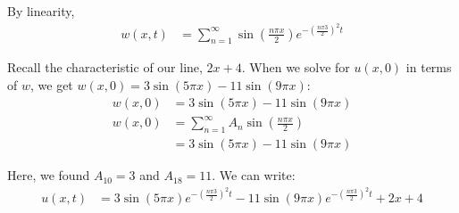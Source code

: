 \begin{enumerate}
By linearity,
%
\begin{align}
  w(x, t) & =
  \sum^\infty_{n = 1}
  \sin\left(\frac{n \pi x}{2}\right)
  e^{- \left( \frac{n \pi 3}{2} \right)^2 t}
\end{align}

Recall the characteristic of our line, $2x + 4$. When we solve for $u(x, 0)$ in terms of $w$, we get $w(x, 0) = 3 \sin(5 \pi x) - 11 \sin(9 \pi x)$:
%
\begin{align}
  w(x, 0) & =
  3 \sin(5 \pi x) - 11 \sin(9 \pi x)\\
  w(x, 0) & =
  \sum^\infty_{n = 1}
  A_n \sin\left(\frac{n \pi x}{2}\right)\\
  & = 3\sin(5 \pi x) - 11\sin(9 \pi x)
\end{align}

Here, we found $A_{10} = 3$ and $A_{18} = 11$. We can write:
%
\begin{align}
  u(x, t) & = 3\sin(5 \pi x)e^{- \left( \frac{n \pi 3}{2} \right)^2 t} - 11\sin(9 \pi x)e^{- \left( \frac{n \pi 3}{2} \right)^2 t} + 2x + 4
\end{align}
\end{enumerate}
